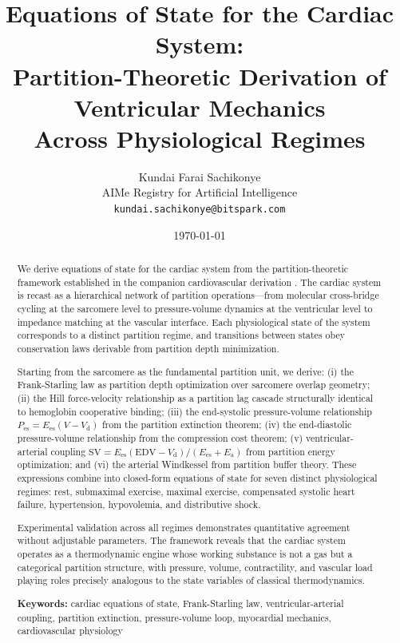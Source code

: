 \documentclass[10pt,twocolumn,a4paper]{article}
\title{\textbf{Equations of State for the Cardiac System: \\
Partition-Theoretic Derivation of Ventricular Mechanics \\
Across Physiological Regimes}}
\author{
Kundai Farai Sachikonye\\
AIMe Registry for Artificial Intelligence\\
\texttt{kundai.sachikonye@bitspark.com}
}
\date{\today}
\theoremstyle{remark}
\newcommand{\Ees}{E_{\mathrm{es}}}
\newcommand{\Ea}{E_{\mathrm{a}}}
\newcommand{\Vd}{V_{\mathrm{d}}}
\newcommand{\Pes}{P_{\mathrm{es}}}
\newcommand{\SV}{\mathrm{SV}}
\newcommand{\EDV}{\mathrm{EDV}}
\begin{document}
\maketitle

\begin{abstract}
We derive equations of state for the cardiac system from the partition-theoretic framework established in the companion cardiovascular derivation \cite{sachikonye2024cardio}. The cardiac system is recast as a hierarchical network of partition operations—from molecular cross-bridge cycling at the sarcomere level to pressure-volume dynamics at the ventricular level to impedance matching at the vascular interface. Each physiological state of the system corresponds to a distinct partition regime, and transitions between states obey conservation laws derivable from partition depth minimization.

Starting from the sarcomere as the fundamental partition unit, we derive: (i) the Frank-Starling law as partition depth optimization over sarcomere overlap geometry; (ii) the Hill force-velocity relationship as a partition lag cascade structurally identical to hemoglobin cooperative binding; (iii) the end-systolic pressure-volume relationship $\Pes = \Ees(V - \Vd)$ from the partition extinction theorem; (iv) the end-diastolic pressure-volume relationship from the compression cost theorem; (v) ventricular-arterial coupling $\SV = \Ees(\EDV - \Vd)/(\Ees + \Ea)$ from partition energy optimization; and (vi) the arterial Windkessel from partition buffer theory. These expressions combine into closed-form equations of state for seven distinct physiological regimes: rest, submaximal exercise, maximal exercise, compensated systolic heart failure, hypertension, hypovolemia, and distributive shock.

Experimental validation across all regimes demonstrates quantitative agreement without adjustable parameters. The framework reveals that the cardiac system operates as a thermodynamic engine whose working substance is not a gas but a categorical partition structure, with pressure, volume, contractility, and vascular load playing roles precisely analogous to the state variables of classical thermodynamics.

\textbf{Keywords:} cardiac equations of state, Frank-Starling law, ventricular-arterial coupling, partition extinction, pressure-volume loop, myocardial mechanics, cardiovascular physiology
\end{abstract}

\tableofcontents
\newpage
\end{document}
